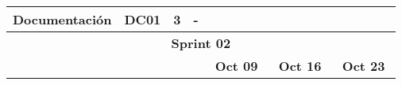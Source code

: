 \begin{table}[h]
\begin{tabular}{|llcllllllllllllllll|}
        \multicolumn{1}{|l|}{Documentación}                                                                        & \multicolumn{1}{l|}{DC01}                                                      & \multicolumn{1}{c|}{3}                                                           & \multicolumn{1}{l|}{-}                                                               & \cellcolor[HTML]{C9C9C9}        & \cellcolor[HTML]{C9C9C9}        & \cellcolor[HTML]{C9C9C9}        & \cellcolor[HTML]{C9C9C9}        & \cellcolor[HTML]{C9C9C9}        & \cellcolor[HTML]{C9C9C9}        & \cellcolor[HTML]{C9C9C9}        & \cellcolor[HTML]{C9C9C9}        & \cellcolor[HTML]{C9C9C9}        & \cellcolor[HTML]{C9C9C9}        & \cellcolor[HTML]{C9C9C9}        & \cellcolor[HTML]{C9C9C9}        & \cellcolor[HTML]{C9C9C9}        & \cellcolor[HTML]{C9C9C9}        & \cellcolor[HTML]{C9C9C9} \\ \hline
        \multicolumn{19}{|c|}{\cellcolor[HTML]{8EA9D8}\textbf{Sprint 02}}                                                                                                                                                                                                                                                                                                                                                                                                                                                                                                                                                                                                                                                                                                                                                                                                                            \\ \hline
        \multicolumn{1}{|c|}{\cellcolor[HTML]{FFFFFF}}                                                             & \multicolumn{1}{c|}{\cellcolor[HTML]{FFFFFF}}                                  & \multicolumn{1}{c|}{\cellcolor[HTML]{FFFFFF}}                                    & \multicolumn{1}{c|}{\cellcolor[HTML]{FFFFFF}}                                        & \multicolumn{5}{c|}{\textbf{Oct 09}}                                                                                                                                    & \multicolumn{5}{c|}{\textbf{Oct 16}}                                                                                                                                    & \multicolumn{5}{c|}{\textbf{Oct 23}}                                                                                                                             \\ \cline{5-19} 

\end{tabular}
\end{table}
